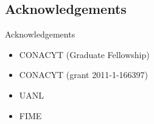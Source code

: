 
\subsection{Acknowledgements}
\begin{frame}{Acknowledgements}
\begin{itemize}
\item CONACYT (Graduate Fellowship)
\item CONACYT (grant 2011-1-166397)
\item UANL
\item FIME
\end{itemize}

\end{frame}
